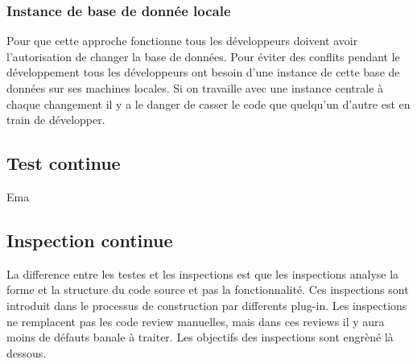 

\subsubsection{Instance de base de donnée locale}

Pour que cette approche fonctionne tous les développeurs doivent avoir l'autorisation de changer la base de données. Pour éviter des conflits pendant le développement tous les développeurs ont besoin d'une instance de cette base de données sur ses machines locales. Si on travaille avec une instance centrale à chaque changement il y a le danger de casser le code que quelqu'un d'autre est en train de développer.

\subsection{Test continue}

Ema

\subsection{Inspection continue}

La difference entre les testes et les inspections est que les inspections analyse la forme et la structure du code source et pas la fonctionnalité. Ces inspections sont introduit dans le processus de construction par differents plug-in. Les inspections ne remplacent pas les code review manuelles, mais dans ces reviews il y aura moins de défauts banale à traiter. Les objectifs des inspections sont engrèné là dessous.

